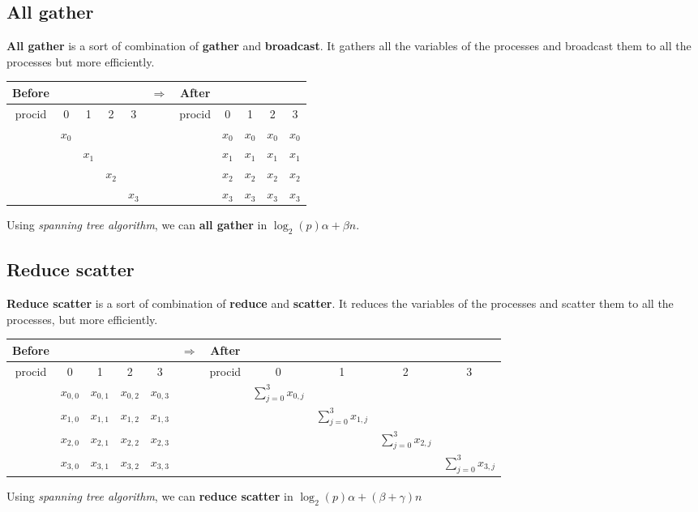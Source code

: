 \documentclass[12pt, openany]{report}
\theoremstyle{definition}
\begin{document}
\subsection{All gather}
\textbf{All gather} is a sort of combination of \textbf{gather} and \textbf{broadcast}. It gathers all the variables of the processes and broadcast them to all the processes but more efficiently.\\
\begin{center}
	\begin{tabular}{ccccc|c|ccccc}
		Before &&&&& $\Longrightarrow$ &After&&&&\\
		\hline
		procid & 0 & 1 & 2 & 3 & & procid & 0 & 1 & 2 & 3\\
		\hline
		& $x_0$ &&&&& & $x_0$ & $x_0$ & $x_0$ & $x_0$\\
		&& $x_1$ &&&& & $x_1$ & $x_1$ & $x_1$ & $x_1$\\
		&&& $x_2$ &&& & $x_2$ & $x_2$ & $x_2$ & $x_2$\\
		&&&& $x_3$ && & $x_3$ & $x_3$ & $x_3$ & $x_3$\\
		\hline
	\end{tabular}
\end{center}
Using \textit{spanning tree algorithm}, we can \textbf{all gather} in $\log_2(p)\alpha + \beta n$.
\subsection{Reduce scatter}
\textbf{Reduce scatter} is a sort of combination of \textbf{reduce} and \textbf{scatter}. It reduces the variables of the processes and scatter them to all the processes, but more efficiently.\\
\begin{center}
	\begin{tabular}{ccccc|c|ccccc}
		Before &&&&& $\Longrightarrow$ &After&&&&\\
		\hline
		procid & 0 & 1 & 2 & 3 & & procid & 0 & 1 & 2 & 3\\
		\hline
		& $x_{0,0}$ & $x_{0,1}$ & $x_{0,2}$ & $x_{0,3}$ &&& $\displaystyle \sum_{j=0}^{3} x_{0,j}$ &&&\\
		& $x_{1,0}$ & $x_{1,1}$ & $x_{1,2}$ & $x_{1,3}$ &&&& $\displaystyle \sum_{j=0}^{3} x_{1,j}$ &&\\
		& $x_{2,0}$ & $x_{2,1}$ & $x_{2,2}$ & $x_{2,3}$ &&&&& $\displaystyle \sum_{j=0}^{3} x_{2,j}$ &\\
		& $x_{3,0}$ & $x_{3,1}$ & $x_{3,2}$ & $x_{3,3}$ &&&&&& $\displaystyle \sum_{j=0}^{3} x_{3,j}$ \\
		\hline
	\end{tabular}
\end{center}
Using \textit{spanning tree algorithm}, we can \textbf{reduce scatter} in $\log_2(p)\alpha + (\beta + \gamma) n$
\end{document}
